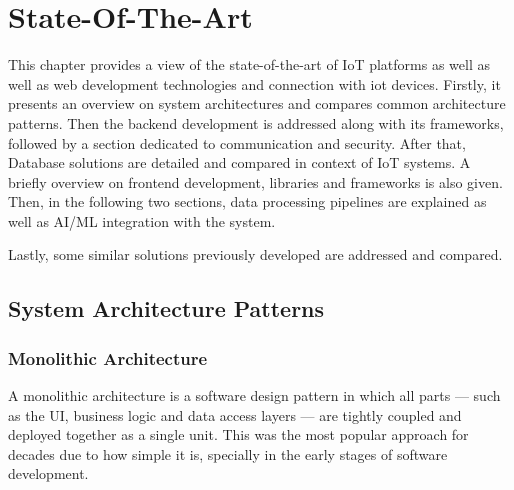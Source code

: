 
%

\chapter{State-Of-The-Art}
\label{cha:State-Of-The-Art}

This chapter provides a view of the state-of-the-art of IoT platforms as well
as well as web development technologies and connection with iot devices.
Firstly, it presents an overview on system architectures and compares common
architecture patterns. Then the backend development is addressed along with
its frameworks, followed by a section dedicated to communication and security.
After that, Database solutions are detailed and compared in context of IoT
systems. A briefly overview on frontend development, libraries and frameworks is
also given.
Then, in the following two sections, data processing pipelines are explained as
well as AI/ML integration with the system.

Lastly, some similar solutions previously developed are addressed and compared.

\section{System Architecture Patterns}

\subsection{Monolithic Architecture}
A monolithic architecture is a software design pattern in which all parts ---
such as the \gls{UI}, business logic and data access layers --- are tightly
coupled and deployed together as a single unit\cite{7436659,10031648}. This
was the most popular approach for decades due to how simple it is, specially in
the early stages of software development\cite{Garlan2018}.

